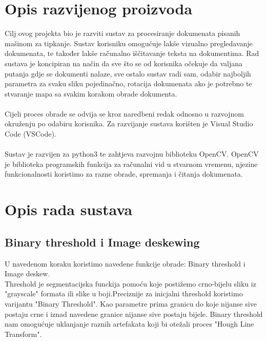 \documentclass{article}
\begin{document}
\section{Opis razvijenog proizvoda}
Cilj ovog projekta bio je razviti sustav za procesiranje dokumenata pisanih mašinom za tipkanje. Sustav korisniku omogućuje lakše vizualno pregledavanje dokumenata, te također lakše računalno iščitavanje teksta na dokumentima. Rad sustava je koncipiran na način da sve što se od korisnika očekuje da valjana putanja gdje se dokumenti nalaze, sve ostalo sustav radi sam, odabir najboljih parametra za svaku sliku pojedinačno, rotacija dokumenata ako je potrebno te stvaranje mapa sa svakim korakom obrade dokumenta.\\
\\
Cijeli proces obrade se odvija se kroz naredbeni redak odnosno u razvojnom okruženju po odabiru korisnika. Za razvijanje sustava korišten je Visual Studio Code (VSCode).\\
\\
Sustav je razvijen za python3 te zahtjeva razvojnu biblioteku OpenCV. OpenCV je biblioteka programskih funkcija za računalni vid u stvarnom vremenu,  njezine funkcionalnosti koristimo za razne obrade, spremanja i čitanja dokumenata.

\section{Opis rada sustava}

\subsection{Binary threshold i Image deskewing}

U navedenom koraku koristimo navedene funkcije obrade: Binary threshold i Image deskew.\\
Threshold je segmentacijska funckija pomoću koje postižemo crno-bijelu sliku iz "grayscale" formata ili slike u boji.Preciznije za inicjalni threshold koristimo varijantu "Binary Threshold". Kao parametre prima granicu do koje nijanse sive postaju crne i iznad navedene granice nijanse sive postaju bijele. %
Binary threshold nam omogućuje uklanjanje raznih artefakata koji bi otežali proces "Hough Line Transform".\\
\end{document}
